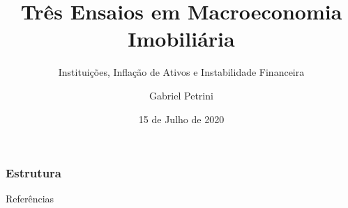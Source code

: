 \documentclass[11pt]{beamer}
\author{Gabriel Petrini}
\title{Três Ensaios em Macroeconomia Imobiliária}
\subtitle{Instituições, Inflação de Ativos e Instabilidade Financeira}
\institute{IE/Unicamp}
\date{15 de Julho de 2020}
\begin{document}
\begin{frame}[plain]
	\maketitle
\end{frame}

\begin{frame}
\frametitle{Estrutura}
    \tableofcontents
\end{frame}








\begin{frame}[allowframebreaks]{Referências}
\printbibliography
\end{frame}
\end{document}
